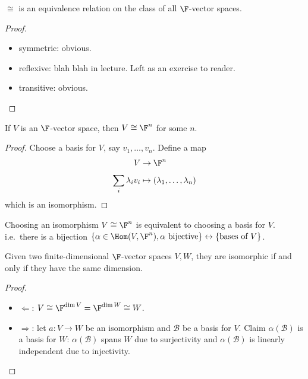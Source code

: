\documentclass[a4paper]{article}
\newcommand*{\basis}{\mathcal}
\theoremstyle{definition}
\begin{document}
\begin{lemma}
  \(\cong\) is an equivalence relation on the class of all \(\F\)-vector spaces.
\end{lemma}

\begin{proof}\leavevmode
  \begin{itemize}
  \item symmetric: obvious.
  \item reflexive: blah blah in lecture. Left as an exercise to reader.
  \item transitive: obvious.
  \end{itemize}
\end{proof}

\begin{theorem}
  If \(V\) is an \(\F\)-vector space, then \(V \cong \F^n\) for some \(n\).
\end{theorem}

\begin{proof}
  Choose a basis for \(V\), say \(v_1,\ldots, v_n\). Define a map
  \begin{align*}
    V &\to \F^n \\
    \sum_{i}^{ }\lambda_iv_i &\mapsto (\lambda_1,\ldots,\lambda_n)
  \end{align*}
which is an isomorphism.
\end{proof}

\begin{remark}
  Choosing an isomorphism \(V \cong \F^n\) is equivalent to choosing a basis for \(V\). i.e.\ there is a bijection \(\{\alpha\in\Hom(V,\F^n), \alpha\text{ bijective}\} \leftrightarrow \{\text{bases of } V\} \).
\end{remark}

\begin{theorem}
  Given two finite-dimensional \(\F\)-vector spaces \(V, W\), they are isomorphic if and only if they have the same dimension.
\end{theorem}

\begin{proof}\leavevmode
  \begin{itemize}
  \item \(\Leftarrow\): \(V \cong \F^{\dim V} = \F^{\dim W} \cong W\).
  \item \(\Rightarrow\): let \(a:V\to W\) be an isomorphism and \(\basis B\) be a basis for \(V\). Claim \(\alpha(\basis B)\) is a basis for \(W\): \(\alpha(\basis B)\) spans \(W\) due to surjectivity and \(\alpha(\basis B)\) is linearly independent due to injectivity.
  \end{itemize}
\end{proof}
\end{document}
